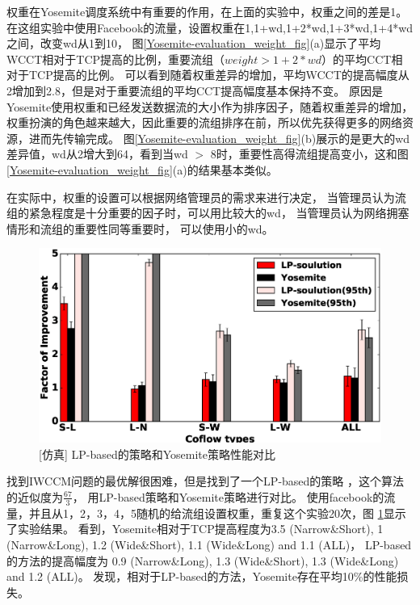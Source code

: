 权重在Yosemite调度系统中有重要的作用，在上面的实验中，权重之间的差是1。
在这组实验中使用Facebook的流量，设置权重在1,1+wd,1+2*wd,1+3*wd,1+4*wd之间，改变wd从1到10，
图\ref{Yosemite-evaluation_weight_fig}(a)显示了平均WCCT相对于TCP提高的比例，重要流组（$weight> 1+2*wd$）的平均CCT相对于TCP提高的比例。
可以看到随着权重差异的增加，平均WCCT的提高幅度从2增加到2.8，但是对于重要流组的平均CCT提高幅度基本保持不变。
原因是Yosemite使用权重和已经发送数据流的大小作为排序因子，随着权重差异的增加，权重扮演的角色越来越大，因此重要的流组排序在前，所以优先获得更多的网络资源，进而先传输完成。
图\ref{Yosemite-evaluation_weight_fig}(b)展示的是更大的wd差异值，wd从2增大到64，看到当wd $>$ 8时，重要性高得流组提高变小，这和图\ref{Yosemite-evaluation_weight_fig}(a)的结果基本类似。

在实际中，权重的设置可以根据网络管理员的需求来进行决定，
当管理员认为流组的紧急程度是十分重要的因子时，可以用比较大的wd，
当管理员认为网络拥塞情形和流组的重要性同等重要时，
可以使用小的wd。

\begin{figure}[b]
\begin{center}
\includegraphics [width=0.8\columnwidth] {figures/Yosemite/figs/fake/fake1.eps}
\caption{[仿真] LP-based的策略和Yosemite策略性能对比}
\label{Yosemite-LP-based-fig}
\end{center}
\end{figure}
找到IWCCM问题的最优解很困难，但是找到了一个LP-based的策略\cite{qiu2015minimizing} ，这个算法的近似度为$\frac{67}{3}$，
用LP-based策略和Yosemite策略进行对比。
使用facebook的流量，并且从1，2，3，4，5随机的给流组设置权重，重复这个实验20次，图 \ref{Yosemite-LP-based-fig}显示了实验结果。
看到，Yosemite相对于TCP提高程度为3.5 (Narrow\&Short), 1 (Narrow\&Long), 1.2 (Wide\&Short), 1.1 (Wide\&Long) and 1.1 (ALL)，
LP-based的方法的提高幅度为 0.9 (Narrow\&Long), 1.3 (Wide\&Short), 1.3 (Wide\&Long) and 1.2 (ALL)。
发现，相对于LP-based的方法，Yosemite存在平均10\%的性能损失。

